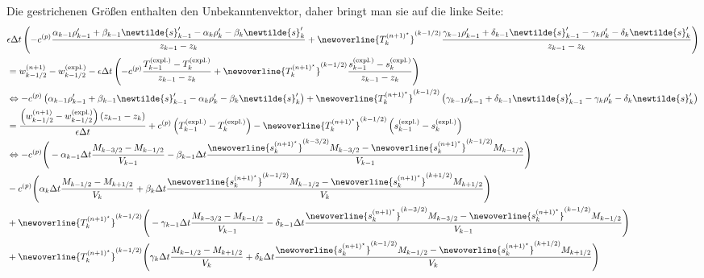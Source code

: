 %
Die gestrichenen Größen enthalten den Unbekanntenvektor, daher bringt man sie auf die linke Seite:
%
\begin{align}
&\epsilon\Delta t\left(-c^{(p)}\frac{\alpha_{k - 1}\rho'_{k - 1} + \beta_{k - 1}\newtilde{s}'_{k - 1} - \alpha_k\rho'_k - \beta_k\newtilde{s}'_k}{z_{k - 1} - z_{k}} + \newoverline{T_k^{(n + 1)^\star}}^{(k - 1/2)}\frac{\gamma_{k - 1}\rho'_{k - 1} + \delta_{k - 1}\newtilde{s}'_{k - 1} - \gamma_k\rho'_k - \delta_k\newtilde{s}'_k}{z_{k - 1} - z_k}\right)\nonumber\\
&= w_{k - 1/2}^{(n + 1)} - w_{k - 1/2}^{(\text{expl.})} - \epsilon\Delta t\left(-c^{(p)}\frac{T^{(\text{expl.})}_{k - 1} - T^{(\text{expl.})}_{k}}{z_{k - 1} - z_{k}} + \newoverline{T_k^{(n + 1)^\star}}^{(k - 1/2)}\frac{s^{(\text{expl.})}_{k - 1} - s^{(\text{expl.})}_k}{z_{k - 1} - z_k}\right)\nonumber\\
&\Leftrightarrow-c^{(p)}\left(\alpha_{k - 1}\rho'_{k - 1} + \beta_{k - 1}\newtilde{s}'_{k - 1} - \alpha_k\rho'_k - \beta_k\newtilde{s}'_k\right) + \newoverline{T_k^{(n + 1)^\star}}^{(k - 1/2)}\left(\gamma_{k - 1}\rho'_{k - 1} + \delta_{k - 1}\newtilde{s}'_{k - 1} - \gamma_k\rho'_k - \delta_k\newtilde{s}'_k\right)\nonumber\\
&= \frac{\left(w_{k - 1/2}^{(n + 1)} - w_{k - 1/2}^{(\text{expl.})}\right)\left(z_{k - 1} - z_k\right)}{\epsilon\Delta t} + c^{(p)}\left(T^{(\text{expl.})}_{k - 1} - T^{(\text{expl.})}_{k}\right) - \newoverline{T_k^{(n + 1)^\star}}^{(k - 1/2)}\left(s^{(\text{expl.})}_{k - 1} - s^{(\text{expl.})}_k\right)\nonumber\\
&\Leftrightarrow-c^{(p)}\Bigg(-\alpha_{k - 1}\Delta t\frac{M_{k - 3/2} - M_{k - 1/2}}{V_{k - 1}} - \beta_{k - 1}\Delta t\frac{\newoverline{s_k^{(n + 1)^\star}}^{(k - 3/2)}M_{k - 3/2} - \newoverline{s_k^{(n + 1)^\star}}^{(k - 1/2)}M_{k - 1/2}}{V_{k - 1}}\Bigg)\nonumber\\
&-c^{(p)}\Bigg(\alpha_k\Delta t\frac{M_{k - 1/2} - M_{k + 1/2}}{V_k} + \beta_k\Delta t\frac{\newoverline{s_k^{(n + 1)^\star}}^{(k - 1/2)}M_{k - 1/2} - \newoverline{s_k^{(n + 1)^\star}}^{(k + 1/2)}M_{k + 1/2}}{V_k}\Bigg)\nonumber\\
&+ \newoverline{T_k^{(n + 1)^\star}}^{(k - 1/2)}\Bigg(-\gamma_{k - 1}\Delta t\frac{M_{k - 3/2} - M_{k - 1/2}}{V_{k - 1}} - \delta_{k - 1}\Delta t\frac{\newoverline{s_k^{(n + 1)^\star}}^{(k - 3/2)}M_{k - 3/2} - \newoverline{s_k^{(n + 1)^\star}}^{(k - 1/2)}M_{k - 1/2}}{V_{k - 1}}\Bigg)\nonumber\\
&+ \newoverline{T_k^{(n + 1)^\star}}^{(k - 1/2)}\Bigg(\gamma_k\Delta t\frac{M_{k - 1/2} - M_{k + 1/2}}{V_k} + \delta_k\Delta t\frac{\newoverline{s_k^{(n + 1)^\star}}^{(k - 1/2)}M_{k - 1/2} - \newoverline{s_k^{(n + 1)^\star}}^{(k + 1/2)}M_{k + 1/2}}{V_k}\Bigg)\nonumber\\

\end{align}
